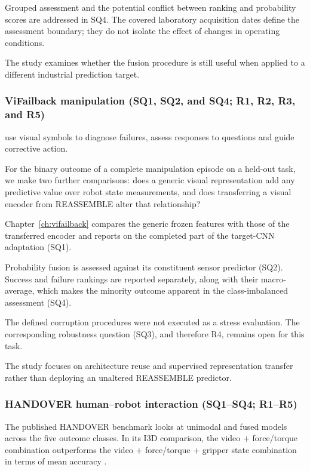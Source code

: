 Grouped assessment and the potential conflict between ranking and probability scores are addressed
in SQ4. The covered laboratory acquisition dates define the assessment boundary; they do not isolate
the effect of changes in operating conditions.

The study examines whether the fusion procedure is still useful when applied to a different
industrial prediction target.

\subsubsection*{ViFailback manipulation (SQ1, SQ2, and SQ4; R1, R2, R3, and R5)}

\textcite[Tables~2--4]{Zeng2026ViFailback} use visual symbols to diagnose failures, assess responses to questions and guide
corrective action.

For the binary outcome of a complete manipulation episode on a held-out task, we make two further
comparisons: does a generic visual representation add any predictive value over robot state
measurements, and does transferring a visual encoder from REASSEMBLE alter that relationship?

Chapter~\ref{ch:vifailback} compares the generic frozen features with those of the transferred
encoder and reports on the completed part of the target-CNN adaptation (SQ1).

Probability fusion is assessed against its constituent sensor predictor (SQ2). Success and failure
rankings are reported separately, along with their macro-average, which makes the minority outcome
apparent in the class-imbalanced assessment (SQ4).

The defined corruption procedures were not executed as a stress evaluation. The corresponding
robustness question (SQ3), and therefore R4, remains open for this task.

The study focuses on architecture reuse and supervised representation transfer rather than deploying
an unaltered REASSEMBLE predictor.

\subsubsection*{HANDOVER human--robot interaction (SQ1--SQ4; R1--R5)}

The published HANDOVER benchmark looks at unimodal and fused models across the five outcome classes.
In its I3D comparison, the video + force/torque combination outperforms the video + force/torque +
gripper state combination in terms of mean accuracy \parencite[PDF p.~7,
Table~III]{Thoduka2024Handover}.

